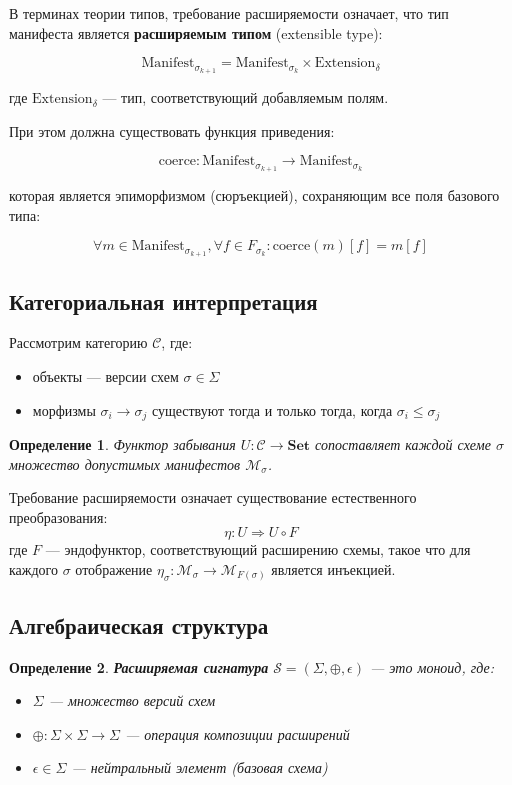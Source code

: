 \documentclass{article}
\newtheorem{definition}{Определение}
\begin{document}
В терминах теории типов, требование расширяемости означает, что тип манифеста является \textbf{расширяемым типом} (extensible type):

\[
\text{Manifest}_{\sigma_{k+1}} = \text{Manifest}_{\sigma_k} \times \text{Extension}_{\delta}
\]

где $\text{Extension}_{\delta}$ — тип, соответствующий добавляемым полям.

При этом должна существовать функция приведения:

\[
\text{coerce}: \text{Manifest}_{\sigma_{k+1}} \to \text{Manifest}_{\sigma_k}
\]

которая является эпиморфизмом (сюръекцией), сохраняющим все поля базового типа:

\[
\forall m \in \text{Manifest}_{\sigma_{k+1}}, \forall f \in F_{\sigma_k}: \text{coerce}(m)[f] = m[f]
\]

\subsection{Категориальная интерпретация}

Рассмотрим категорию $\mathcal{C}$, где:
\begin{itemize}
    \item объекты — версии схем $\sigma \in \Sigma$
    \item морфизмы $\sigma_i \to \sigma_j$ существуют тогда и только тогда, когда $\sigma_i \leq \sigma_j$
\end{itemize}

\begin{definition}
Функтор забывания $U: \mathcal{C} \to \textbf{Set}$ сопоставляет каждой схеме $\sigma$ множество допустимых манифестов $\mathcal{M}_{\sigma}$.
\end{definition}

Требование расширяемости означает существование естественного преобразования:
\[
\eta: U \Rightarrow U \circ F
\]
где $F$ — эндофунктор, соответствующий расширению схемы, такое что для каждого $\sigma$ отображение $\eta_{\sigma}: \mathcal{M}_{\sigma} \to \mathcal{M}_{F(\sigma)}$ является инъекцией.

\subsection{Алгебраическая структура}

\begin{definition}
\textbf{Расширяемая сигнатура} $\mathcal{S} = (\Sigma, \oplus, \epsilon)$ — это моноид, где:
\begin{itemize}
    \item $\Sigma$ — множество версий схем
    \item $\oplus: \Sigma \times \Sigma \to \Sigma$ — операция композиции расширений
    \item $\epsilon \in \Sigma$ — нейтральный элемент (базовая схема)
\end{itemize}
\end{definition}
\end{document}
